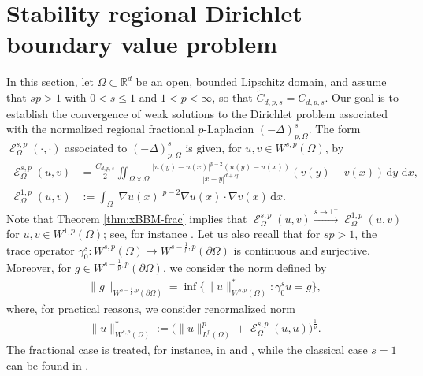 \documentclass[12pt, reqno]{amsart}%
\theoremstyle{plain}  %
\theoremstyle{definition}  %
\theoremstyle{remark}
\numberwithin{equation}{section}
\DeclareMathOperator{\cE}{\mathcal{E}}
\renewcommand{\d}{\,\mathrm{d}}
\begin{document}
\section{Stability regional Dirichlet boundary value problem} \label{sec:application-interpola}
In this section, let $\Omega \subset \mathbb{R}^d$ be an open, bounded Lipschitz domain, and assume that $sp>1$ with $0<s\leq 1$ and $1<p<\infty$, so that $\widetilde{C}_{d,p,s}= C_{d,p,s}$.  Our goal is to establish the convergence of weak solutions to the Dirichlet problem associated with the normalized regional fractional $p$-Laplacian $(-\Delta)_{p,\Omega}^s$.
 The form  $\cE^{s,p}_\Omega(\cdot,\cdot)$ associated to $(-\Delta)_{p,\Omega}^s$ is given, for $u,v\in W^{s,p}(\Omega)$, by
\begin{align*}
\cE^{s,p}_{\Omega}(u,v) &= \frac{C_{d,p,s}}{2} \iint_{\Omega \times \Omega}  \frac{|u(y)-u(x)|^{p-2}(u(y)-u(x)) }{|x-y|^{d+sp}} (v(y)-v(x))\d y \, \d x,\\
\cE^{1,p}_{\Omega}(u,v)&:= \int_\Omega |\nabla u(x)|^{p-2}\nabla u(x)\cdot \nabla v(x)\d x.
\end{align*}
Note that Theorem \ref{thm:xBBM-frac} implies that
$\cE^{s,p}_{\Omega}(u,v)\xrightarrow{s\to 1^-} \cE^{1,p}_{\Omega}(u,v)$ for $u,v\in W^{1,p}(\Omega)$;  see, for instance \cite{Fog26}.
Let us also recall that for $sp > 1$, the trace operator $\gamma^s_0: W^{s,p}(\Omega) \to W^{s-\frac{1}{p},p}(\partial\Omega)$ is continuous and surjective. Moreover, for $g \in W^{s-\frac{1}{p},p}(\partial\Omega)$, we consider the norm defined by
\begin{align*}
\|g\|_{W^{s-\frac{1}{p},p}(\partial\Omega)}
= \inf \big\{ \|u\|^*_{W^{s,p}(\Omega)} : \gamma^s_0 u = g \big\},
\end{align*}
where, for practical reasons, we consider renormalized norm
\begin{align*}
\|u\|^*_{W^{s,p}(\Omega)}
:= \big( \|u\|_{L^p(\Omega)}^p + \cE^{s,p}_{\Omega}(u,u) \big)^{\frac{1}{p}}.
\end{align*}
The fractional case is treated, for instance, in \cite{DMT22} and \cite[Chapter~9]{Leo23}, while the classical case $s = 1$ can be found in \cite[Chapter~III]{BF13}.

\end{document}
